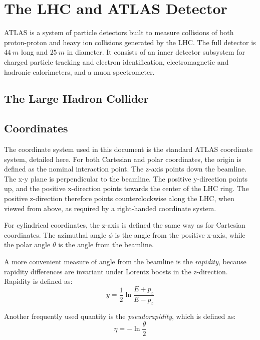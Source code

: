 \chapter{The LHC and ATLAS Detector}\label{ch:atlas}

ATLAS is a system of particle detectors built to measure collisions of both proton-proton and heavy ion collisions
generated by the LHC.\cite{atlas-detector-2008}
The full detector is $44~m$ long and $25~m$ in diameter.
It consists of an inner detector subsystem for charged particle tracking and electron identification,
electromagnetic and hadronic calorimeters, and a muon spectrometer.

\section{The Large Hadron Collider}\label{sec:lhc}

\section{Coordinates}\label{sec:coordinates}
The coordinate system used in this document is the standard ATLAS coordinate system, detailed here.
For both Cartesian and polar coordinates, the origin is defined as the nominal interaction point.
The z-axis points down the beamline.
The x-y plane is perpendicular to the beamline.
The positive y-direction points up, and the positive x-direction points towards the center of the LHC ring.
The positive z-direction therefore points counterclockwise along the LHC, when viewed from above,
as required by a right-handed coordinate system.

For cylindrical coordinates, the z-axis is defined the same way as for
Cartesian coordinates. The azimuthal angle $\phi$ is the angle
from the positive x-axis, while the polar angle $\theta$ is the angle
from the beamline.

A more convenient measure of angle from the beamline is the
\textit{rapidity}, because rapidity differences are invariant under Lorentz boosts in the
z-direction.
Rapidity is defined as:
\begin{equation}
y = \frac{1}{2}\ln\frac{E+p_z}{E-p_z}
\end{equation}

Another frequently used quantity is the
\textit{pseudorapidity}, which is defined as:
\begin{equation}
\eta = -\ln\frac{\theta}{2}
\end{equation}

